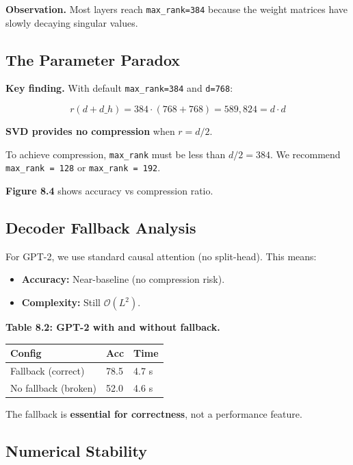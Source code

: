 \textbf{Observation.} Most layers reach \texttt{max\_rank=384} because the weight 
matrices have slowly decaying singular values.

\subsection{The Parameter Paradox}

\textbf{Key finding.} With default \texttt{max\_rank=384} and \texttt{d=768}:

\[
r(d + d\_h) = 384 \cdot (768 + 768) = 589,824 = d \cdot d
\]

\textbf{SVD provides no compression} when $r = d/2$.

To achieve compression, \texttt{max\_rank} must be less than $d/2 = 384$. We 
recommend \texttt{max\_rank = 128} or \texttt{max\_rank = 192}.

\textbf{Figure 8.4} shows accuracy vs compression ratio.

\subsection{Decoder Fallback Analysis}

For GPT-2, we use standard causal attention (no split-head). This means:

\begin{itemize}
\item \textbf{Accuracy:} Near-baseline (no compression risk).
\item \textbf{Complexity:} Still $\mathcal{O}(L^2)$.

\end{itemize}
\textbf{Table 8.2: GPT-2 with and without fallback.}

\begin{table}[H]
\centering
\small
\begin{tabular}{lll}
\toprule
\textbf{Config} & \textbf{Acc} & \textbf{Time} \\
\midrule
Fallback (correct) & 78.5 & 4.7 s \\
No fallback (broken) & 52.0 & 4.6 s \\
\bottomrule
\end{tabular}
\end{table}

The fallback is \textbf{essential for correctness}, not a performance feature.

\subsection{Numerical Stability}

